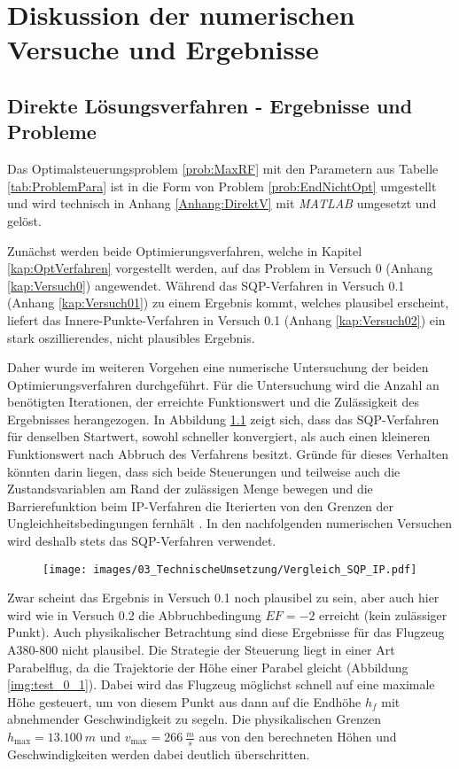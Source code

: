 \chapter{Diskussion der numerischen Versuche und Ergebnisse}\label{kap:LSG}

\section{Direkte Lösungsverfahren - Ergebnisse und Probleme}
Das Optimalsteuerungsproblem \ref{prob:MaxRF} mit den Parametern aus Tabelle \ref{tab:ProblemPara} ist in die Form von Problem \ref{prob:EndNichtOpt} umgestellt und wird technisch in Anhang \ref{Anhang:DirektV} mit \textit{MATLAB} umgesetzt und gelöst.

Zunächst werden beide Optimierungsverfahren, welche in Kapitel \ref{kap:OptVerfahren} vorgestellt werden, auf das Problem in Versuch 0 (Anhang \ref{kap:Versuch0}) angewendet. Während das SQP-Verfahren in Versuch 0.1 (Anhang \ref{kap:Versuch01}) zu einem Ergebnis kommt, welches plausibel erscheint, liefert das Innere-Punkte-Verfahren in Versuch 0.1 (Anhang \ref{kap:Versuch02}) ein stark oszillierendes, nicht plausibles Ergebnis.

Daher wurde im weiteren Vorgehen eine numerische Untersuchung der beiden Optimierungsverfahren durchgeführt. Für die Untersuchung wird die Anzahl an benötigten Iterationen, der erreichte Funktionswert und die Zulässigkeit des Ergebnisses herangezogen. In Abbildung \ref{img:Vergleich_SQP_IP} zeigt sich, dass das SQP-Verfahren für denselben Startwert, sowohl schneller konvergiert, als auch einen kleineren Funktionswert nach Abbruch des Verfahrens besitzt. Gründe für dieses Verhalten könnten darin liegen, dass sich beide Steuerungen und teilweise auch die Zustandsvariablen am Rand der zulässigen Menge bewegen und die Barrierefunktion beim IP-Verfahren die Iterierten von den Grenzen der Ungleichheitsbedingungen fernhält \cite{Matlab2016}. In den nachfolgenden numerischen Versuchen wird deshalb stets das SQP-Verfahren verwendet.

\begin{figure}[htbp]
    \begin{center}
        \texttt{[image: images/03\_TechnischeUmsetzung/Vergleich\_SQP\_IP.pdf]}
         \label{img:Vergleich_SQP_IP}
    \end{center}
\end{figure}

Zwar scheint das Ergebnis in Versuch 0.1 noch plausibel zu sein, aber auch hier wird wie in Versuch 0.2 die Abbruchbedingung $EF = -2$ erreicht (kein zulässiger Punkt). Auch physikalischer Betrachtung sind diese Ergebnisse für das Flugzeug A380-800 nicht plausibel. Die Strategie der Steuerung liegt in einer Art Parabelflug, da die Trajektorie der Höhe einer Parabel gleicht (Abbildung \ref{img:test_0_1}). Dabei wird das Flugzeug möglichst schnell auf eine maximale Höhe gesteuert, um von diesem Punkt aus dann auf die Endhöhe $h_f$ mit abnehmender Geschwindigkeit zu segeln. Die physikalischen Grenzen $h_{\max} = 13.100 \ m$ und $v_{\max} = 266 \ \frac{m}{s}$ aus \cite{A380Tech} von den berechneten Höhen und Geschwindigkeiten werden dabei deutlich überschritten.

